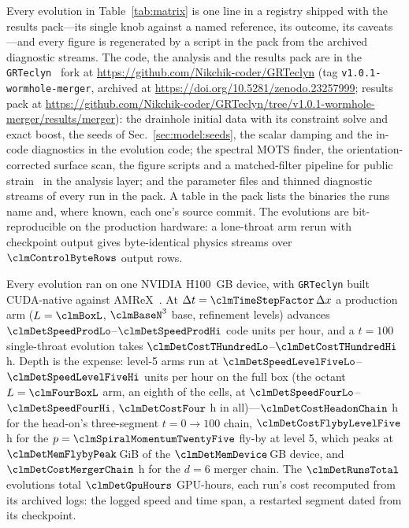 \documentclass[twocolumn,floatfix,aps,prd,superscriptaddress,nofootinbib]{revtex4-2}
\begin{document}
Every evolution in Table~\ref{tab:matrix} is one line in a registry shipped with the results pack---its single knob against a named reference, its outcome, its caveats---and every figure is regenerated by a script in the pack from the archived diagnostic streams. The code, the analysis and the results pack are in the \texttt{GRTeclyn}~\cite{grteclyn} fork at \url{https://github.com/Nikchik-coder/GRTeclyn} (tag \texttt{v1.0.1-wormhole-merger}, archived at \url{https://doi.org/10.5281/zenodo.23257999}; results pack at \url{https://github.com/Nikchik-coder/GRTeclyn/tree/v1.0.1-wormhole-merger/results/merger}): the drainhole initial data with its constraint solve and exact boost, the seeds of Sec.~\ref{sec:model:seeds}, the scalar damping and the in-code diagnostics in the evolution code; the spectral MOTS finder, the orientation-corrected surface scan, the figure scripts and a matched-filter pipeline for public strain~\cite{gwosc,pycbc} in the analysis layer; and the parameter files and thinned diagnostic streams of every run in the pack. A table in the pack lists the binaries the runs name and, where known, each one's source commit. The evolutions are bit-reproducible on the production hardware: a lone-throat arm rerun with checkpoint output gives byte-identical physics streams over $\clmControlByteRows$ output rows.

Every evolution ran on one NVIDIA H100 \clmDetMemDevice\,GB device, with \texttt{GRTeclyn} built CUDA-native against AMReX~\clmDetAmrexVersion. At $\Delta t=\clmTimeStepFactor\,\Delta x$ a production arm ($L=\clmBoxL$, $\clmBaseN^3$ base, \clmProdLevels{} refinement levels) advances $\clmDetSpeedProdLo$--$\clmDetSpeedProdHi$ code units per hour, and a $t=100$ single-throat evolution takes $\clmDetCostTHundredLo$--$\clmDetCostTHundredHi$ h. Depth is the expense: level-5 arms run at $\clmDetSpeedLevelFiveLo$--$\clmDetSpeedLevelFiveHi$ units per hour on the full box (the octant $L=\clmFourBoxL$ arm, an eighth of the cells, at $\clmDetSpeedFourLo$--$\clmDetSpeedFourHi$, $\clmDetCostFour$ h in all)---$\clmDetCostHeadonChain$ h for the head-on's three-segment $t=0\to100$ chain, $\clmDetCostFlybyLevelFive$ h for the $p=\clmSpiralMomentumTwentyFive$ fly-by at level 5, which peaks at $\clmDetMemFlybyPeak$\,GiB of the $\clmDetMemDevice$\,GB device, and $\clmDetCostMergerChain$ h for the $d=6$ merger chain. The $\clmDetRunsTotal$ evolutions total $\clmDetGpuHours$ GPU-hours, each run's cost recomputed from its archived logs: the logged speed and time span, a restarted segment dated from its checkpoint.
\end{document}
